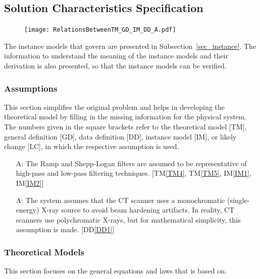 \documentclass[12pt]{article}
\newcounter{assumpnum} %
\begin{document}
\subsection{Solution Characteristics Specification}
\begin{figure}[H]
  \texttt{[image: RelationsBetweenTM\_GD\_IM\_DD\_A.pdf]}
\end{figure}

The instance models that govern \progname{} are presented in
Subsection~\ref{sec_instance}.  The information to understand the meaning of the
instance models and their derivation is also presented, so that the instance
models can be verified.


\subsubsection{Assumptions} \label{sec_assumpt}
This section simplifies the original problem and helps in developing the
theoretical model by filling in the missing information for the physical system.
The numbers given in the square brackets refer to the theoretical model [TM],
general definition [GD], data definition [DD], instance model [IM], or likely
change [LC], in which the respective assumption is used.

\begin{itemize}
\item[A\refstepcounter{assumpnum}\theassumpnum \label{A1}:] The Ramp and
  Shepp-Logan filters are assumed to be representative of high-pass and low-pass
  filtering techniques. [TM\ref{TM4}, TM\ref{TM5}, IM\ref{IM1}, IM\ref{IM2}]

\item[A\refstepcounter{assumpnum}\theassumpnum \label{A2}:] The system assumes that
  the CT scanner uses a monochromatic (single-energy) X-ray source to avoid beam
  hardening artifacts. In reality, CT scanners use polychromatic X-rays, but for
  mathematical simplicity, this assumption is made. [DD\ref{DD1}]
\end{itemize}

\subsubsection{Theoretical Models}\label{sec_theoretical}
This section focuses on the general equations and laws that \progname{} is based
on.
~\newline
\end{document}

